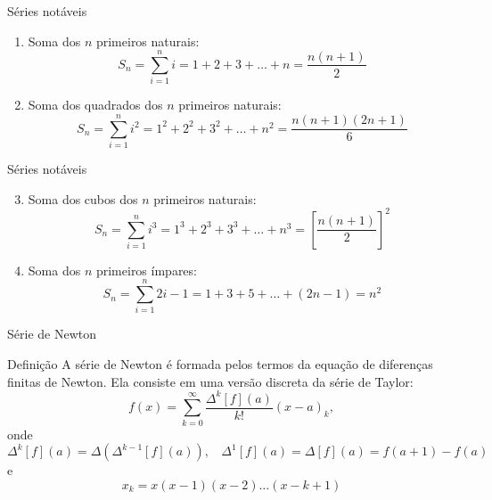 \begin{frame}[fragile]{Séries notáveis}

    \begin{enumerate}
        \item Soma dos $n$ primeiros naturais:
$$
    S_n = \sum_{i = 1}^n i = 1 + 2 + 3 + \ldots + n = \frac{n(n + 1)}{2}
$$

        \item Soma dos quadrados dos $n$ primeiros naturais:
$$
    S_n = \sum_{i = 1}^n i^2 = 1^2 + 2^2 + 3^2 + \ldots + n^2 = \frac{n(n + 1)(2n + 1)}{6}
$$

    \end{enumerate}

\end{frame}

\begin{frame}[fragile]{Séries notáveis}

    \begin{enumerate}
        \setcounter{enumi}{2}
        \item Soma dos cubos dos $n$ primeiros naturais:
$$
    S_n = \sum_{i = 1}^n i^3 = 1^3 + 2^3 + 3^3 + \ldots + n^3 = \left[\frac{n(n + 1)}{2}\right]^2
$$

        \item Soma dos $n$ primeiros ímpares:
$$
    S_n = \sum_{i = 1}^n  2i - 1 = 1 + 3 + 5 + \ldots + (2n - 1) = n^2
$$
    \end{enumerate}

\end{frame}

\begin{frame}[fragile]{Série de Newton}

    \begin{block}{Definição}
        A série de Newton é formada pelos termos da equação de diferenças finitas de Newton. Ela consiste em uma versão discreta da série de Taylor:
        $$
            f(x) = \sum_{k = 0}^\infty \frac{\Delta^k[f](a)}{k!}(x - a)_k,
        $$
        onde
        $$
            \Delta^k[f](a) = \Delta(\Delta^{k - 1}[f](a)), \ \ \ \ \Delta^1[f](a) = \Delta[f](a) = f(a + 1) - f(a)
        $$
        e
        $$
            x_k = x(x - 1)(x - 2)\ldots (x - k + 1)
        $$
    \end{block}

\end{frame}

